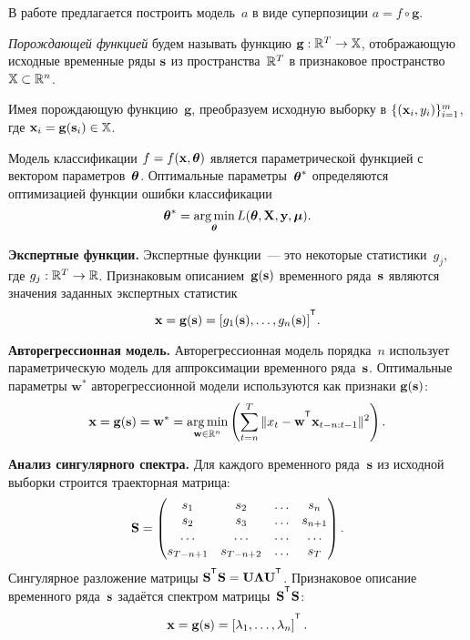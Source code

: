 \documentclass[11pt, a5paper]{dissert}
\begin{document}
В работе предлагается построить модель~$a$ в виде суперпозиции $a = f \circ \mathbf{g}$.
\vspace{0.1cm}
\begin{definition}
	\textit{Порождающей функцией} будем называть функцию $\mathbf{g}: \mathbb{R}^T \rightarrow \mathbb{X}$, отображающую исходные временные ряды $\mathbf{s}$ из пространства~$\mathbb{R}^{T} $ в признаковое пространство~$\mathbb{X} \subset \mathbb{R}^n$.
\end{definition}
Имея порождающую функцию~$\mathbf{g}$, преобразуем исходную выборку в $\{(\mathbf{x}_i, y_i)\}_{i=1}^m$, где $\mathbf{x}_i = \mathbf{g}(\mathbf{s}_i) \in \mathbb{X}$. 

Модель классификации $f=f(\mathbf{x}, \boldsymbol{\theta})$ является параметрической функцией с вектором параметров~$\boldsymbol{\theta}$. 
Оптимальные параметры~$\boldsymbol{\theta}^*$ определяются оптимизацией функции ошибки классификации
\begin{equation}
	\boldsymbol{\theta}^* = \mathop{\arg \min}\limits_{\boldsymbol{\theta}} L(\boldsymbol{\theta}, \mathbf{X}, \mathbf{y}, \boldsymbol{\mu}).
	\label{ch6:eq:optimal_classification_params}
\end{equation}

\textbf{Экспертные функции.}
Экспертные функции~--- это некоторые статистики~$g_j$, где $g_j: \mathbb{R}^T \rightarrow \mathbb{R}$.
Признаковым описанием~$\mathbf{g}(\mathbf{s})$ временного ряда~$\mathbf{s}$ являются значения заданных экспертных статистик
\[
	\bx = \mathbf{g}(\bs) = [g_1(\bs), \dots, g_n(\bs)]^{\T}.
\]

\textbf{Авторегрессионная модель.}
Авторегрессионная модель порядка~$n$ использует параметрическую модель для аппроксимации временного ряда~$\mathbf{s}$.
Оптимальные параметры $\mathbf{w}^*$ авторегрессионной модели используются как признаки $\mathbf{g}(\mathbf{s})$:
\begin{equation}
	\bx = \mathbf{g}(\bs) = \mathbf{w}^* = \argmin_{\mathbf{w} \in \bbR^{n}} \left( \sum_{t=n}^{T} \|x_t - \bw^{\T} \bx_{t - n: t-1} \|^2\right).
	\label{ch6:eq:autoregressive_description}
\end{equation}

\textbf{Анализ сингулярного спектра.}
Для каждого временного ряда~$\mathbf{s}$ из исходной выборки строится траекторная матрица:
\[
	\mathbf{S} = 
	\begin{pmatrix}
		s_1 & s_2 & \dots & s_n \\
		s_2 & s_3 & \dots & s_{n+1} \\
		\dots & \dots & \dots & \dots \\
		s_{T-n+1} & s_{T-n+2} & \dots & s_T
	\end{pmatrix}.
\]
Сингулярное разложение матрицы $\mathbf{S}^{\T} \mathbf{S} = \bU \boldsymbol{\Lambda} \bU^{\T}$.
Признаковое описание временного ряда~$\mathbf{s}$ задаётся спектром матрицы~$\bS^{\T} \bS$:
\[
	\bx = \mathbf{g}(\bs) = \left[\lambda_1, \dots, \lambda_n\right]^{\T}.
\]
\end{document}
